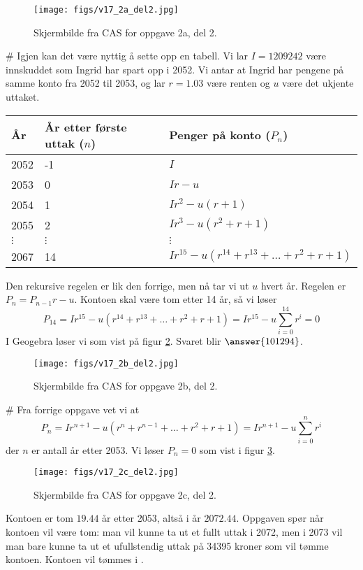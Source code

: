 \begin{easylist}[enumerate]
	\begin{figure}[th!]
		\centering
		\texttt{[image: figs/v17\_2a\_del2.jpg]}
		\caption{Skjermbilde fra CAS for oppgave 2a, del 2.}
		\label{fig:cas1}
	\end{figure}
	# Igjen kan det være nyttig å sette opp en tabell.
	Vi lar $I = 1209242$ være innskuddet som Ingrid har spart opp i 2052. Vi antar at Ingrid har pengene på samme konto fra 2052 til 2053, og lar $r = 1.03$ være renten og $u$ være det ukjente uttaket.
		\begin{center}
		\begin{tabular}{lll}
			\textbf{År} & \textbf{År etter første uttak} ($n$) & \textbf{Penger på konto} ($P_n$) \\ \hline
			2052 & -1 & $I$ \\
			2053 & 0 & $Ir - u$ \\
			2054 & 1 & $Ir^2 - u(r+1)$ \\
			2055 & 2 & $Ir^3 - u(r^2 + r+1)$ \\
			$\vdots$ & $\vdots$ & $\vdots$ \\
			2067 & 14 & $Ir^{15} - u (r^{14} + r^{13} + \dots + r^2 + r + 1)$
		\end{tabular}
	\end{center}
	Den rekursive regelen er lik den forrige, men nå tar vi ut $u$ hvert år. Regelen er $P_n = P_{n-1}r - u$. Kontoen skal være tom etter 14 år, så vi løser
	\begin{equation*}
		P_{14} = Ir^{15} - u (r^{14} + r^{13} + \dots + r^2 + r + 1) = Ir^{15} - u \sum_{i = 0}^{14} r^i = 0
	\end{equation*}
	I Geogebra løser vi som vist på figur \ref{fig:cas2}. Svaret blir $\answer{101294}$.
	\begin{figure}[th!]
		\centering
		\texttt{[image: figs/v17\_2b\_del2.jpg]}
		\caption{Skjermbilde fra CAS for oppgave 2b, del 2.}
		\label{fig:cas2}
	\end{figure}
	

	# Fra forrige oppgave vet vi at
	\begin{equation*}
		P_{n} = Ir^{n+1} - u (r^{n} + r^{n-1} + \dots + r^2 + r + 1) = Ir^{n+1} - u \sum_{i = 0}^{n} r^i
	\end{equation*}
	der $n$ er antall år etter 2053.
	Vi løser $P_n = 0$ som vist i figur \ref{fig:cas3}.
	\begin{figure}[th!]
		\centering
		\texttt{[image: figs/v17\_2c\_del2.jpg]}
		\caption{Skjermbilde fra CAS for oppgave 2c, del 2.}
		\label{fig:cas3}
	\end{figure}
	Kontoen er tom $19.44$ år etter 2053, altså i år $2072.44$.
	Oppgaven spør når kontoen vil være tom:
	man vil kunne ta ut et fullt uttak i 2072, men i 2073 vil man bare kunne ta 
	ut et ufullstendig uttak på 34395 kroner som vil tømme kontoen. Kontoen vil 
	tømmes i .
\end{easylist}


